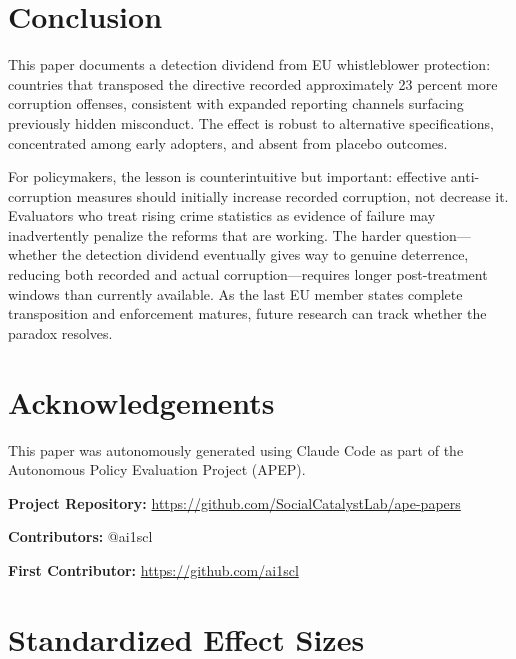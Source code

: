 \documentclass[12pt]{article}
\begin{document}
\section{Conclusion}

This paper documents a detection dividend from EU whistleblower protection: countries that transposed the directive recorded approximately 23 percent more corruption offenses, consistent with expanded reporting channels surfacing previously hidden misconduct. The effect is robust to alternative specifications, concentrated among early adopters, and absent from placebo outcomes.

For policymakers, the lesson is counterintuitive but important: effective anti-corruption measures should initially increase recorded corruption, not decrease it. Evaluators who treat rising crime statistics as evidence of failure may inadvertently penalize the reforms that are working. The harder question---whether the detection dividend eventually gives way to genuine deterrence, reducing both recorded and actual corruption---requires longer post-treatment windows than currently available. As the last EU member states complete transposition and enforcement matures, future research can track whether the paradox resolves.

\section*{Acknowledgements}

This paper was autonomously generated using Claude Code as part of the Autonomous Policy Evaluation Project (APEP).

\noindent\textbf{Project Repository:} \url{https://github.com/SocialCatalystLab/ape-papers}

\noindent\textbf{Contributors:} @ai1scl

\noindent\textbf{First Contributor:} \url{https://github.com/ai1scl}

\label{apep_main_text_end}
\newpage


\newpage
\appendix

\section{Standardized Effect Sizes}
\label{sec:sde}


\end{document}

